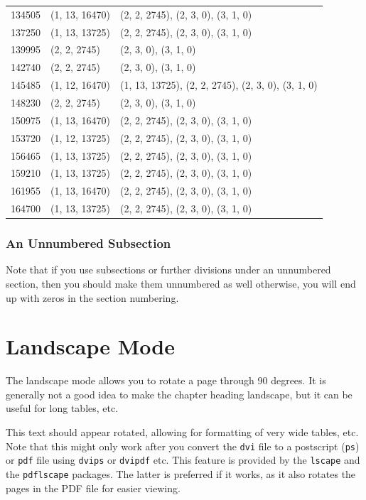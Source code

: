 \documentclass[msc,oneside]{ubcthesis}
\begin{document}
\begin{center}
\begin{longtable}{|l|l|l|}
    134505 & (1, 13, 16470) & (2, 2, 2745), (2, 3, 0), (3, 1, 0) \\
    137250 & (1, 13, 13725) & (2, 2, 2745), (2, 3, 0), (3, 1, 0) \\
    139995 & (2, 2, 2745) & (2, 3, 0), (3, 1, 0) \\
    142740 & (2, 2, 2745) & (2, 3, 0), (3, 1, 0) \\
    145485 & (1, 12, 16470) & (1, 13, 13725), (2, 2, 2745), (2, 3, 0), (3, 1, 0) \\
    148230 & (2, 2, 2745) & (2, 3, 0), (3, 1, 0) \\
    150975 & (1, 13, 16470) & (2, 2, 2745), (2, 3, 0), (3, 1, 0) \\
    153720 & (1, 12, 13725) & (2, 2, 2745), (2, 3, 0), (3, 1, 0) \\
    156465 & (1, 13, 13725) & (2, 2, 2745), (2, 3, 0), (3, 1, 0) \\
    159210 & (1, 13, 13725) & (2, 2, 2745), (2, 3, 0), (3, 1, 0) \\
    161955 & (1, 13, 16470) & (2, 2, 2745), (2, 3, 0), (3, 1, 0) \\
    164700 & (1, 13, 13725) & (2, 2, 2745), (2, 3, 0), (3, 1, 0) \\
\end{longtable}
\end{center}

\subsection*{An Unnumbered Subsection}
Note that if you use subsections or further divisions under an
unnumbered section, then you should make them unnumbered as well
otherwise, you will end up with zeros in the section numbering.

\chapter{Landscape Mode}
The landscape mode allows you to rotate a page through 90 degrees.  It
is generally not a good idea to make the chapter heading landscape,
but it can be useful for long tables, etc.

\begin{landscape}
  This text should appear rotated, allowing for formatting of very
  wide tables, etc.  Note that this might only work after you convert
  the \texttt{dvi} file to a postscript (\texttt{ps}) or \texttt{pdf}
  file using \texttt{dvips} or \texttt{dvipdf} etc.  This feature is
  provided by the \verb|lscape| and the \verb|pdflscape| packages.
  The latter is preferred if it works, as it also rotates the pages in
  the PDF file for easier viewing.
\end{landscape}
\end{document}
